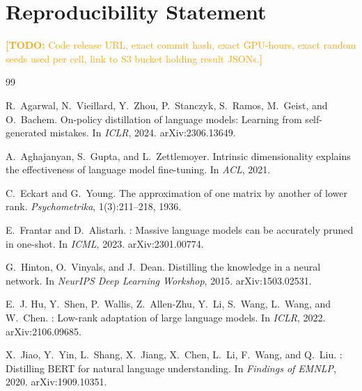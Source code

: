 \documentclass{article}
\newcommand{\todo}[1]{\textcolor{orange}{\textbf{[TODO:} #1\textbf{]}}}
\begin{document}
\section*{Reproducibility Statement}
\todo{Code release URL, exact commit hash, exact GPU-hours, exact
random seeds used per cell, link to S3 bucket holding result JSONs.}


\begin{thebibliography}{99}\small

R.~Agarwal, N.~Vieillard, Y.~Zhou, P.~Stanczyk, S.~Ramos, M.~Geist, and O.~Bachem.
\newblock On-policy distillation of language models: Learning from self-generated mistakes.
\newblock In \emph{ICLR}, 2024. arXiv:2306.13649.

A.~Aghajanyan, S.~Gupta, and L.~Zettlemoyer.
\newblock Intrinsic dimensionality explains the effectiveness of language model fine-tuning.
\newblock In \emph{ACL}, 2021.

C.~Eckart and G.~Young.
\newblock The approximation of one matrix by another of lower rank.
\newblock \emph{Psychometrika}, 1(3):211--218, 1936.

E.~Frantar and D.~Alistarh.
: Massive language models can be accurately pruned in one-shot.
\newblock In \emph{ICML}, 2023. arXiv:2301.00774.

G.~Hinton, O.~Vinyals, and J.~Dean.
\newblock Distilling the knowledge in a neural network.
\newblock In \emph{NeurIPS Deep Learning Workshop}, 2015. arXiv:1503.02531.

E.~J. Hu, Y.~Shen, P.~Wallis, Z.~Allen-Zhu, Y.~Li, S.~Wang, L.~Wang, and W.~Chen.
: Low-rank adaptation of large language models.
\newblock In \emph{ICLR}, 2022. arXiv:2106.09685.

X.~Jiao, Y.~Yin, L.~Shang, X.~Jiang, X.~Chen, L.~Li, F.~Wang, and Q.~Liu.
: Distilling {BERT} for natural language understanding.
\newblock In \emph{Findings of EMNLP}, 2020. arXiv:1909.10351.


\end{thebibliography}
\end{document}
